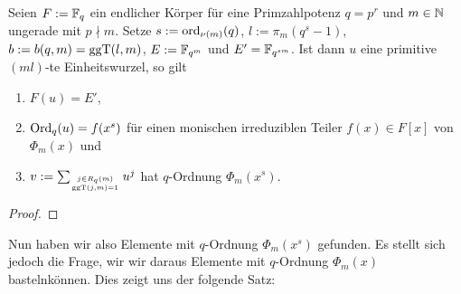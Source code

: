 \begin{satz}
  \label{satz:konstruktion_q_ordnung_reg}
  Seien $F := \mathbb{F}_q$ ein endlicher Körper für eine Primzahlpotenz $q = p^r$ 
  und $m\in\mathbb{N}$ ungerade mit $p\nmid m$.
  Setze $s := \operatorname{ord}_{\nu(m)}(q)$, 
  $l := \pi_m(q^s-1)$, $b:= b(q,m) = \operatorname{ggT}(l,m)$, $E := \mathbb{F}_{q^m}$ und
  $E' = \mathbb{F}_{q^{sm}}$. Ist dann
  $u$ eine primitive $(ml)$-te Einheitswurzel, so gilt
  \begin{enumerate}
    \item $F(u) = E'$,
    \item $\operatorname{Ord}_q(u) = f(x^s)$ für einen monischen irreduziblen Teiler 
      $f(x) \in F[x]$ von $\Phi_m(x)$ und 
    \item $v := \sum_{j \in R_q(m)\atop \operatorname{ggT}(j,m)=1} 
      u^j$ hat $q$-Ordnung $\Phi_m(x^s)$.
  \end{enumerate}
\end{satz}
\begin{proof}
  \TODO
\end{proof}

Nun haben wir also Elemente mit $q$-Ordnung $\Phi_m(x^s)$ gefunden. Es stellt
sich jedoch die Frage, wir wir daraus Elemente mit $q$-Ordnung $\Phi_m(x)$ 
\glqq basteln\grqq können. Dies zeigt uns der folgende Satz:

